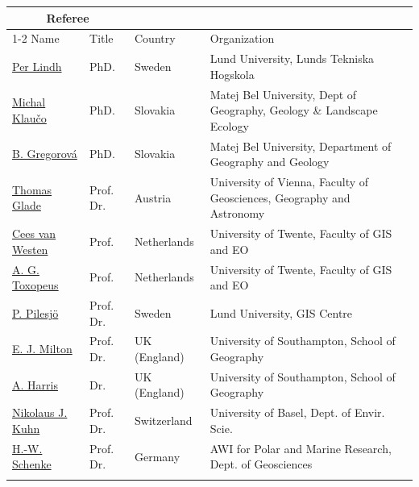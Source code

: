 \documentclass[10pt]{article}
\begin{document}
\begin{tabular}{p{2.7cm} p{1.7cm} p{2.5cm} p{7.5cm}}  
\toprule
\multicolumn{2}{c}{\textbf{Referee}} \\
\cmidrule(r){1-2}
Name & Title & Country & Organization \\
\midrule
\href{https://www.lunduniversity.lu.se/lucat/user/b7f52f8354e529f9fb536d46582e02e2}{Per Lindh} & PhD. & Sweden & Lund University, Lunds Tekniska Hogskola\\
\rowcolor{Lavender}
	\href{https://drive.google.com/file/d/1PUFvQkLrY8ZMwK_pzK_R8R20Dp982U1W/view?usp=sharing}{Michal Klau\v{c}o} & PhD. & Slovakia & Matej Bel University, Dept of Geography, Geology \& Landscape Ecology\\
	\href{https://drive.google.com/file/d/1zdeVOFVFPKBZ4024KCJzGKngkC5-IfLM/view?usp=sharing}{B. Gregorová} & PhD. & Slovakia & Matej Bel University, Department of Geography and Geology \\
\rowcolor{Lavender}
	\href{https://drive.google.com/file/d/1Qt-S-5AbajT0SChMXJrifLQg6CRaWuiN/view?usp=sharing}{Thomas Glade} & Prof. Dr. & Austria & University of Vienna, Faculty of Geosciences, Geography and Astronomy \\
	\href{https://drive.google.com/file/d/11-IoaxsmsiHGeDOlpT_oF4ruDVdgSf6I/view?usp=sharing}{Cees van Westen} & Prof. & Netherlands & University of Twente, Faculty of GIS and EO \\
\rowcolor{Lavender}
	\href{https://drive.google.com/file/d/1_3zIh0jxsPIX9BWuITK4bAbqbXqsx5Um/view?usp=sharing}{A. G. Toxopeus} & Prof. & Netherlands & University of Twente, Faculty of GIS and EO \\
	\href{https://drive.google.com/file/d/1kSNt05NEZwb8ptl8CAKkQfGuUlt8tUj9/view?usp=sharing}{P. Pilesj\"{o}} & Prof. Dr. & Sweden & Lund University, GIS Centre \\
\rowcolor{Lavender}
	\href{https://drive.google.com/file/d/1k_S4zYuXzJbQ2lixuqVriK9Pt9m_ck1L/view?usp=sharing}{E. J. Milton} & Prof. Dr. & UK (England) & University of Southampton,  School of Geography \\
	\href{https://drive.google.com/file/d/1927nFOzndI4IMoP7FH7a-mTL6oUAwciq/view?usp=sharing}{A. Harris} & Dr. & UK (England) & University of Southampton, School of Geography\\
\rowcolor{Lavender}
	\href{https://drive.google.com/file/d/1oFz8JTVuggPcNsPiRXEVFqg3RuC5S-qQ/view?usp=sharing}{Nikolaus J. Kuhn}  & Prof. Dr. & Switzerland & University of Basel, Dept. of Envir. Scie. \\
	\href{https://drive.google.com/file/d/1mMEDsJv8DA5YfcVBIpF-iSUp6RJINrnh/view?usp=sharing}{H.-W. Schenke} & Prof. Dr.  & Germany & AWI for Polar and Marine Research, Dept. of Geosciences\\
\rowcolor{Lavender}

\bottomrule
\end{tabular}
\end{document}
